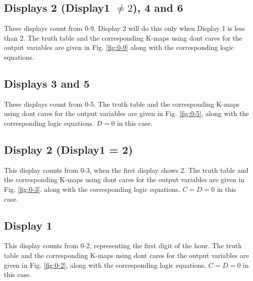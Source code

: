 

\subsection{Displays 2 (Display1 $\ne 2$), 4 and 6}
These displays count from 0-9.  Display 2 will do this only when Display 1 is less than 2.
The truth table 
and the corresponding K-maps using dont cares for the output variables are given in 
Fig. \ref{fig:0-9}
along with the corresponding logic equations.

\subsection{Displays 3 and 5}
These displays count from 0-5.  
The truth table 
and the corresponding K-maps using dont cares for the output variables are given in 
Fig. \ref{fig:0-5},
along with the corresponding logic equations.
    $D = 0$ in this case.

\subsection{Display 2 (Display1 = 2)}
This display counts from 0-3, when the first display shows 2.  
The truth table 
and the corresponding K-maps using dont cares for the output variables are given in 
Fig. \ref{fig:0-3}.
along with the corresponding logic equations.
    $C=D = 0$ in this case.
%

\subsection{Display 1}
This display counts from 0-2, representing the first digit of the hour. 
The truth table 
and the corresponding K-maps using dont cares for the output variables are given in 
Fig. \ref{fig:0-2},
along with the corresponding logic equations.
    $C=D = 0$ in this case.
%

